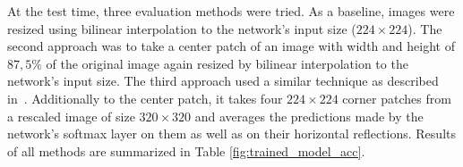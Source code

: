 At the test time, three evaluation methods were tried. As a baseline, images were resized using bilinear interpolation to the network's input size ($224\times 224$). The second approach was to take a center patch of an image with width and height of $87,5\%$ of the original image again resized by bilinear interpolation to the network's input size. The third approach used a similar technique as described in~\cite{AlexNet}. Additionally to the center patch, it takes four $224\times 224$ corner patches from a rescaled image of size $320\times 320$ and averages the predictions made by the network’s softmax layer on them as well as on their horizontal reflections. Results of all methods are summarized in Table \ref{fig:trained_model_acc}.

